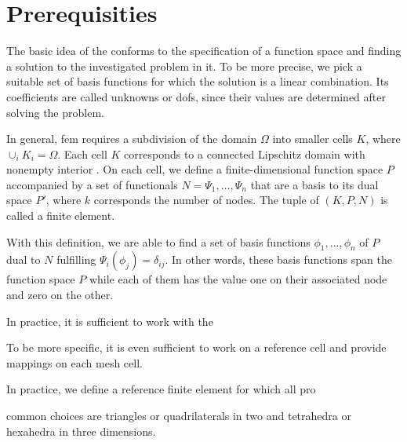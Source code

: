 \section{Prerequisities}
\label{sec:prerequisities}


The basic idea of the  conforms to the specification of a function space and finding a solution to the investigated problem in it. To be more precise, we pick a suitable set of basis functions for which the solution is a linear combination. Its coefficients are called unknowns or \glspl{dof}, since their values are determined after solving the problem.

In general, \gls{fem} requires a subdivision of the domain $\Omega$ into smaller cells $K$, where $\cup_{i} K_i = \Omega$. Each cell $K$ corresponds to a connected Lipschitz domain with nonempty interior .
On each cell, we define a finite-dimensional function space $P$ accompanied by a set of functionals $N = {\Psi_1, \dots, \Psi_n}$ that are a basis to its dual space $P'$, where $k$ corresponds the number of nodes. The tuple of $(K,P,N)$ is called a finite element. 

With this definition, we are able to find a set of basis functions ${\phi_1, ..., \phi_n}$ of $P$ dual to $N$ fulfilling $\Psi_i(\phi_j) = \delta_{ij}$. In other words, these basis functions span the function space $P$ while each of them has the value one on their associated node and zero on the other.

In practice, it is sufficient to work with the 

To be more specific, it is even sufficient to work on a reference cell and provide mappings on each mesh cell.


In practice, we define a reference finite element for which all pro


common choices are triangles or quadrilaterals in two and tetrahedra or hexahedra in three dimensions.

